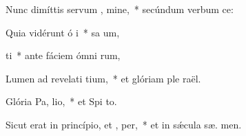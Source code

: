 \item Nunc dimíttis servum , mine,~* secúndum verbum   ce:
\item Quia vidérunt ó i~* sa um,
\item {} ti~* ante fáciem ómni rum,
\item Lumen ad revelati tium,~* et glóriam ple  raël.
\item Glória Pa,  lio,~* et Spi to.
\item Sicut erat in princípio, et ,  per,~* et in sǽcula sæ. men.
